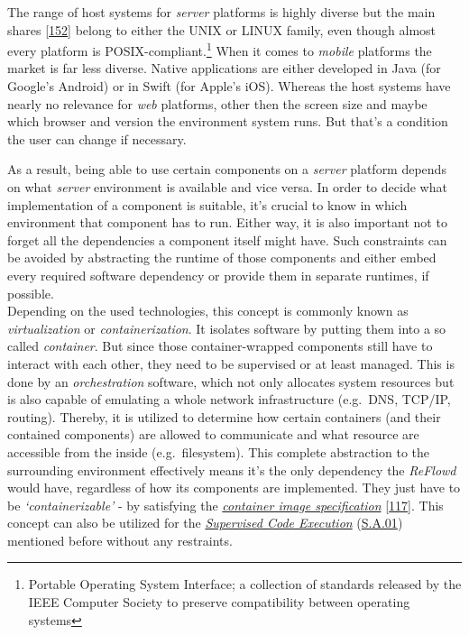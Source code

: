 \documentclass[12pt,english,a4paper,titlepage,cleardoublepage=empty,dottedtoc]{report}
\begin{document}
The range of host systems for \emph{server} platforms is highly diverse
but the main shares
{[}\protect\hyperlink{ref-web_2017_wikipedia_os-market-share}{152}{]}
belong to either the UNIX or LINUX family, even though almost every
platform is POSIX-compliant.\footnote{Portable Operating System
  Interface; a collection of standards released by the IEEE Computer
  Society to preserve compatibility between operating systems} When it
comes to \emph{mobile} platforms the market is far less diverse. Native
applications are either developed in Java (for Google's Android) or in
Swift (for Apple's iOS). Whereas the host systems have nearly no
relevance for \emph{web} platforms, other then the screen size and maybe
which browser and version the environment system runs. But that's a
condition the user can change if necessary.

As a result, being able to use certain components on a \emph{server}
platform depends on what \emph{server} environment is available and vice
versa. In order to decide what implementation of a component is
suitable, it's crucial to know in which environment that component has
to run. Either way, it is also important not to forget all the
dependencies a component itself might have. Such constraints can be
avoided by abstracting the runtime of those components and either embed
every required software dependency or provide them in separate runtimes,
if possible.\\
Depending on the used technologies, this concept is commonly known as
\emph{virtualization} or \emph{containerization}. It isolates software
by putting them into a so called \emph{container}. But since those
container-wrapped components still have to interact with each other,
they need to be supervised or at least managed. This is done by an
\emph{orchestration} software, which not only allocates system resources
but is also capable of emulating a whole network infrastructure
(e.g.~DNS, TCP/IP, routing). Thereby, it is utilized to determine how
certain containers (and their contained components) are allowed to
communicate and what resource are accessible from the inside
(e.g.~filesystem). This complete abstraction to the surrounding
environment effectively means it's the only dependency the
\emph{ReFlowd} would have, regardless of how its components are
implemented. They just have to be \emph{`containerizable'} - by
satisfying the \emph{\protect\hyperlink{def--container}{container image
specification}} {[}\protect\hyperlink{ref-web_oci-spec_image}{117}{]}.
This concept can also be utilized for the
\emph{\protect\hyperlink{supervised-data-access}{Supervised Code
Execution}} (\protect\hyperlink{sa01}{S.A.01}) mentioned before without
any restraints.
\end{document}
